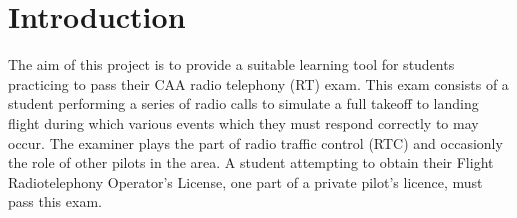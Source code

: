 \section{Introduction}

The aim of this project is to provide a suitable learning tool for students practicing to pass their CAA radio telephony (RT) exam.
This exam consists of a student performing a series of radio calls to simulate a full takeoff to landing flight during which various events which they must respond correctly to may occur.
The examiner plays the part of radio traffic control (RTC) and occasionly the role of other pilots in the area.
A student attempting to obtain their Flight Radiotelephony Operator's License, one part of a private pilot's licence, must pass this exam.